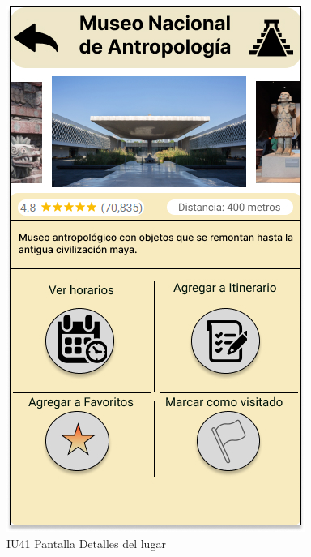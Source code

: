 \begin{figure}[h]
    \begin{minipage}{0.5\textwidth}
        \centering
        \includegraphics[width=.7\linewidth]{Pantallas Prototipo3/IU41-Detalles del lugar.jpg}
        \caption{IU41 Pantalla Detalles del lugar}
    \end{minipage}
    

\end{figure}

